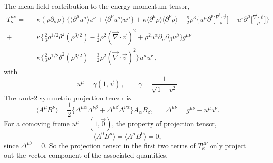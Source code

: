 \documentclass[a4paper,10pt]{article}
\begin{document}


The mean-field contribution to the energy-momentum tensor,
\begin{eqnarray}
T_{\kappa}^{\mu\nu}=&& \kappa(\rho\partial_{\sigma} \rho)\bigg\{\langle\partial^{\mu}u^{\sigma}\rangle u^{\nu}+\langle\partial^{\nu}u^{\sigma}\rangle u^{\mu}\bigg\} 
              +\kappa\langle\partial^{\mu}\rho\rangle \langle\partial^{\nu}\rho\rangle
              -\frac{\kappa}{2}\rho^3 \bigg\{u^{\mu}\partial^{\nu}\bigg[\frac{\vec{\nabla}\cdot \vec{v}}{\rho}\bigg]+u^{\nu}\partial^{\mu}\bigg[\frac{\vec{\nabla}\cdot \vec{v}}{\rho}\bigg] \bigg\}  \nonumber\\
              +&& \kappa\bigg\{ \frac{2}{3}\rho^{1/2}\partial^2(\rho^{3/2})-\frac{1}{2}\rho^2(\vec{\nabla}\cdot \vec{v})^2+\rho^2 u^{\alpha}\partial_{\alpha}\partial_{\beta}u^{\beta} \bigg\}g^{\mu\nu}~\nonumber\\
              -&& \kappa\bigg\{ \frac{2}{3}\rho^{1/2}\partial^2(\rho^{3/2})-\frac{3}{2}\rho^2(\vec{\nabla}\cdot \vec{v})^2 \bigg\}u^{\mu}u^{\nu}~,
\label{Eq1}              
\end{eqnarray}
with
\begin{equation}
 u^{\mu}=\gamma (1,\vec{v})~,~~~~~~~~~\gamma=\frac{1}{\sqrt{1-v^2}}~
\end{equation}
The rank-2 symmetric projection tensor is
\begin{equation}
 \langle A^{\mu}B^{\nu}\rangle=\frac{1}{2}\big\{\Delta^{\mu\alpha}\Delta^{\nu\beta}+\Delta^{\mu\beta}\Delta^{\nu\alpha}\big\}A_{\alpha}B_{\beta},~~~~~~~~\Delta^{\mu\nu}=g^{\mu\nu}-u^{\mu}u^{\nu}.
 \label{proj}
\end{equation}
For a comoving frame $u^{\mu}=(1,\vec{0})$, the property of projection tensor,
\begin{equation}
 \langle A^{0}B^{\mu}\rangle=\langle A^{\mu}B^{0}\rangle=0,
\end{equation}
since $\Delta^{\mu 0}=0$. So the projection tensor in the first two terms of $T_{\kappa}^{\mu\nu}$ only project out the vector component of the associated quantities.
\end{document}
